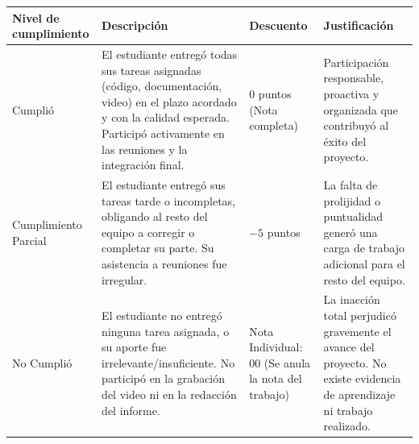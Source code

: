 \documentclass[11pt,a4paper]{article}
\begin{document}
{\small
\begin{tabularx}{\textwidth}{|L{2.3cm}|Y|L{2.4cm}|L{4.2cm}|}\hline
\textbf{Nivel de cumplimiento} & \textbf{Descripción} & \textbf{Descuento} & \textbf{Justificación} \\\hline
Cumplió & El estudiante entregó todas sus tareas asignadas (código, documentación, video) en el plazo acordado y con la calidad esperada. Participó activamente en las reuniones y la integración final. & 0 puntos (Nota completa) & Participación responsable, proactiva y organizada que contribuyó al éxito del proyecto. \\\hline
Cumplimiento Parcial & El estudiante entregó sus tareas tarde o incompletas, obligando al resto del equipo a corregir o completar su parte. Su asistencia a reuniones fue irregular. & $-5$ puntos & La falta de prolijidad o puntualidad generó una carga de trabajo adicional para el resto del equipo. \\\hline
No Cumplió & El estudiante no entregó ninguna tarea asignada, o su aporte fue irrelevante/insuficiente. No participó en la grabación del video ni en la redacción del informe. & Nota Individual: 00 (Se anula la nota del trabajo) & La inacción total perjudicó gravemente el avance del proyecto. No existe evidencia de aprendizaje ni trabajo realizado. \\\hline
\end{tabularx}}
\end{document}
